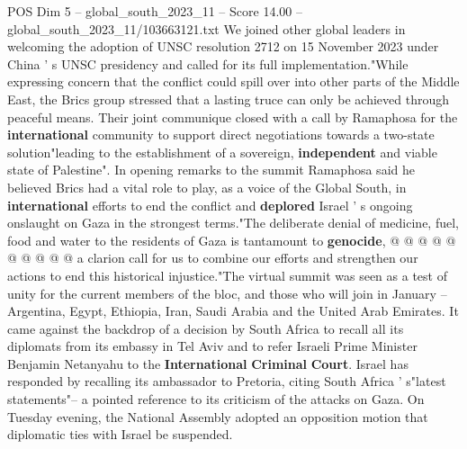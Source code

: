 \begin{textsample}{POS Dim 5 – global\_south\_2023\_11 – Score 14.00 – global\_south\_2023\_11/103663121.txt}
We joined other global leaders in welcoming the adoption of UNSC resolution 2712 on 15 November 2023 under China ' s UNSC presidency and called for its full implementation."While expressing concern that the conflict could spill over into other parts of the Middle East, the Brics group stressed that a lasting truce can only be achieved through peaceful means.
Their joint communique closed with a call by Ramaphosa for the \textbf{international} community to support direct negotiations towards a two-state solution"leading to the establishment of a sovereign, \textbf{independent} and viable state of Palestine".
In opening remarks to the summit Ramaphosa said he believed Brics had a vital role to play, as a voice of the Global South, in \textbf{international} efforts to end the conflict and \textbf{deplored} Israel ' s ongoing onslaught on Gaza in the strongest terms."The deliberate denial of medicine, fuel, food and water to the residents of Gaza is tantamount to \textbf{genocide}, @ @ @ @ @ @ @ @ @ @ a clarion call for us to combine our efforts and strengthen our actions to end this historical injustice."The virtual summit was seen as a test of unity for the current members of the bloc, and those who will join in January -- Argentina, Egypt, Ethiopia, Iran, Saudi Arabia and the United Arab Emirates.
It came against the backdrop of a decision by South Africa to recall all its diplomats from its embassy in Tel Aviv and to refer Israeli Prime Minister Benjamin Netanyahu to the \textbf{International} \textbf{Criminal} \textbf{Court}.
Israel has responded by recalling its ambassador to Pretoria, citing South Africa ' s"latest statements"-- a pointed reference to its criticism of the attacks on Gaza.
On Tuesday evening, the National Assembly adopted an opposition motion that diplomatic ties with Israel be suspended.

\end{textsample}
